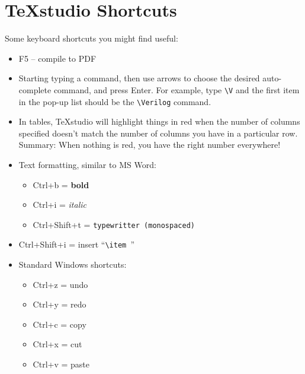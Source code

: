 \documentclass[11pt]{article}
\newcommand{\Verilog}[2][]{%
	
}
\begin{document}
\section*{TeXstudio Shortcuts}
Some keyboard shortcuts you might find useful:

\begin{itemize}
	\item F5 -- compile to PDF
	\item Starting typing a command, then use arrows to choose the desired auto-complete command, and press Enter.  For example, type \verb|\V| and the first item in the pop-up list should be the \verb|\Verilog| command.
	\item In tables, TeXstudio will highlight things in red when the number of columns specified doesn't match the number of columns you have in a particular row.  Summary: When nothing is red, you have the right number everywhere!
	\item Text formatting, similar to MS Word:
	\begin{itemize}
		\item Ctrl+b = \textbf{bold}
		\item Ctrl+i = \textit{italic}
		\item Ctrl+Shift+t = \texttt{typewritter (monospaced)}
	\end{itemize}
	\item Ctrl+Shift+i = insert ``\verb|\item |''
	\item Standard Windows shortcuts:
	\begin{itemize}
		\item Ctrl+z = undo
		\item Ctrl+y = redo
		\item Ctrl+c = copy
		\item Ctrl+x = cut
		\item Ctrl+v = paste
	\end{itemize}
\end{itemize}
\end{document}
